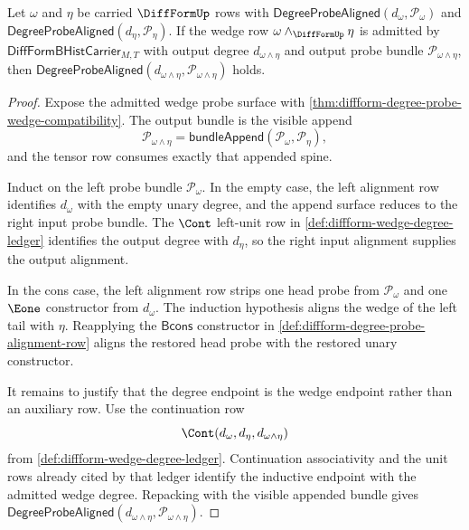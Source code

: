\begin{theorem}
\label{thm:diffform-degree-probe-alignment-wedge-closure}
Let $\omega$ and $\eta$ be carried $\DiffFormUp$ rows with
$\mathsf{DegreeProbeAligned}(d_\omega,\mathcal{P}_\omega)$ and
$\mathsf{DegreeProbeAligned}(d_\eta,\mathcal{P}_\eta)$. If the wedge row
$\omega\wedge_{\DiffFormUp}\eta$ is admitted by
$\mathsf{DiffFormBHistCarrier}_{M,T}$ with output degree
$d_{\omega\wedge\eta}$ and output probe bundle
$\mathcal{P}_{\omega\wedge\eta}$, then
$\mathsf{DegreeProbeAligned}(d_{\omega\wedge\eta},
\mathcal{P}_{\omega\wedge\eta})$ holds.
\end{theorem}
\begin{proof}
Expose the admitted wedge probe surface with
\autoref{thm:diffform-degree-probe-wedge-compatibility}. The output bundle is
the visible append
$$
\mathcal{P}_{\omega\wedge\eta}
=\mathsf{bundleAppend}(\mathcal{P}_\omega,\mathcal{P}_\eta),
$$
and the tensor row consumes exactly that appended spine.

Induct on the left probe bundle $\mathcal{P}_\omega$. In the empty case, the
left alignment row identifies $d_\omega$ with the empty unary degree, and the
append surface reduces to the right input probe bundle. The $\Cont$ left-unit
row in \autoref{def:diffform-wedge-degree-ledger} identifies the output degree
with $d_\eta$, so the right input alignment supplies the output alignment.

In the cons case, the left alignment row strips one head probe from
$\mathcal{P}_\omega$ and one $\Eone$ constructor from $d_\omega$. The induction
hypothesis aligns the wedge of the left tail with $\eta$. Reapplying the
$\mathsf{Bcons}$ constructor in
\autoref{def:diffform-degree-probe-alignment-row} aligns the restored head
probe with the restored unary constructor.

It remains to justify that the degree endpoint is the wedge endpoint rather
than an auxiliary row. Use the continuation row
$$
\Cont(d_\omega,d_\eta,d_{\omega\wedge\eta})
$$
from \autoref{def:diffform-wedge-degree-ledger}. Continuation associativity
and the unit rows already cited by that ledger identify the inductive endpoint
with the admitted wedge degree. Repacking with the visible appended bundle
gives $\mathsf{DegreeProbeAligned}(d_{\omega\wedge\eta},
\mathcal{P}_{\omega\wedge\eta})$.
\end{proof}
